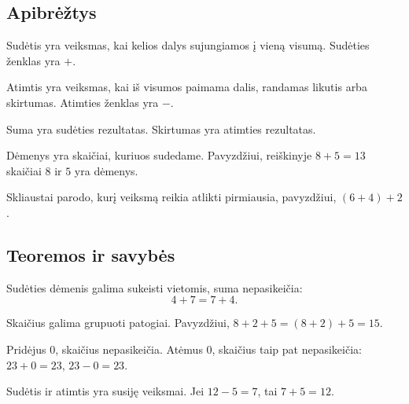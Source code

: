 \subsection{Apibrėžtys}

\begin{apibreztis}
Sudėtis yra veiksmas, kai kelios dalys sujungiamos į vieną visumą. Sudėties ženklas yra \(+\).
\end{apibreztis}

\begin{apibreztis}
Atimtis yra veiksmas, kai iš visumos paimama dalis, randamas likutis arba skirtumas. Atimties ženklas yra \(-\).
\end{apibreztis}

\begin{apibreztis}
Suma yra sudėties rezultatas. Skirtumas yra atimties rezultatas.
\end{apibreztis}

\begin{apibreztis}
Dėmenys yra skaičiai, kuriuos sudedame. Pavyzdžiui, reiškinyje \(8+5=13\) skaičiai \(8\) ir \(5\) yra dėmenys.
\end{apibreztis}

\begin{apibreztis}
Skliaustai parodo, kurį veiksmą reikia atlikti pirmiausia, pavyzdžiui, \((6+4)+2\).
\end{apibreztis}

\subsection{Teoremos ir savybės}

\begin{savybe}
Sudėties dėmenis galima sukeisti vietomis, suma nepasikeičia:
\[
4+7=7+4.
\]
\end{savybe}

\begin{savybe}
Skaičius galima grupuoti patogiai. Pavyzdžiui, \(8+2+5=(8+2)+5=15\).
\end{savybe}

\begin{savybe}
Pridėjus \(0\), skaičius nepasikeičia. Atėmus \(0\), skaičius taip pat nepasikeičia: \(23+0=23\), \(23-0=23\).
\end{savybe}

\begin{savybe}
Sudėtis ir atimtis yra susiję veiksmai. Jei \(12-5=7\), tai \(7+5=12\).
\end{savybe}

